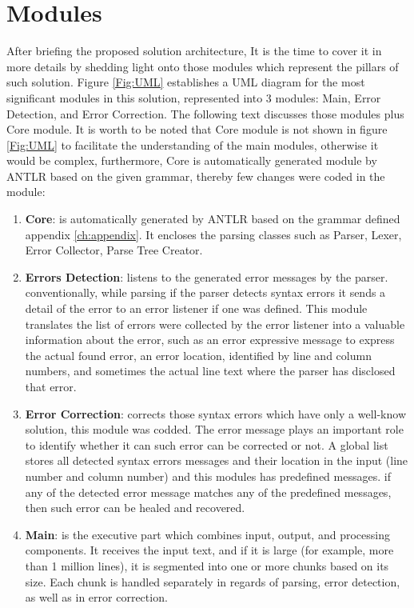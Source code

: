 \section {Modules} 



After briefing the proposed solution architecture, It is the time to cover it in more details by shedding light onto those modules which represent the pillars of such solution. {Figure \ref{Fig:UML}} establishes a UML diagram for the most significant modules in this solution, represented into 3 modules: Main, Error Detection, and Error Correction. The following text discusses those modules plus Core module. It is worth to be noted that Core module is not shown in {figure \ref{Fig:UML}} to facilitate the understanding of the main modules, otherwise it would be complex, furthermore, Core is automatically generated module by ANTLR based on the given grammar, thereby few changes were coded in the module:  
 \begin{enumerate}[]
 \item \textbf {Core}: is automatically generated by ANTLR based on the grammar defined appendix \ref{ch:appendix}. It encloses the parsing classes such as Parser, Lexer, Error Collector, Parse Tree Creator.   
\item \textbf{Errors Detection}: listens to the generated error messages by the parser. conventionally, while parsing if the parser detects syntax errors it sends a detail of the error to an error listener if one was defined. This module translates the list of errors were collected by the error listener into a valuable information about the error, such as an error expressive message to express the actual found error, an error location, identified by line and column numbers, and sometimes the actual line text where the parser has disclosed that error.
\item \textbf {Error Correction}: corrects those syntax errors which have only a well-know solution, this module was codded. The error message plays an important role to identify whether it can such error can be corrected or not. A global list stores all detected syntax errors messages and their location in the input (line number and column number) and this modules has predefined messages. if any of the detected error message matches any of the predefined messages, then such error can be healed and recovered.
\item \textbf{Main}: is the executive part which combines input, output, and processing components. It receives the input text, and if it is large (for example, more than 1 million lines), it is segmented into one or more chunks based on its size. Each chunk is handled separately in regards of parsing, error detection, as well as in error correction.

\end{enumerate} 

